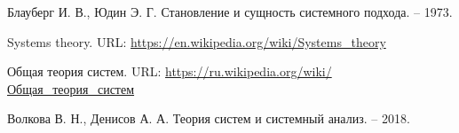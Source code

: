 \begingroup
\begin{thebibliography}{00}
    Блауберг И. В., Юдин Э. Г. Становление и сущность системного подхода. – 1973.

    Systems theory. URL: \small\url{https://en.wikipedia.org/wiki/Systems_theory}\normalsize

    Общая теория систем. URL: \small\url{https://ru.wikipedia.org/wiki/Общая_теория_систем}\normalsize

    Волкова В. Н., Денисов А. А. Теория систем и системный анализ. – 2018.

\end{thebibliography}

\endgroup